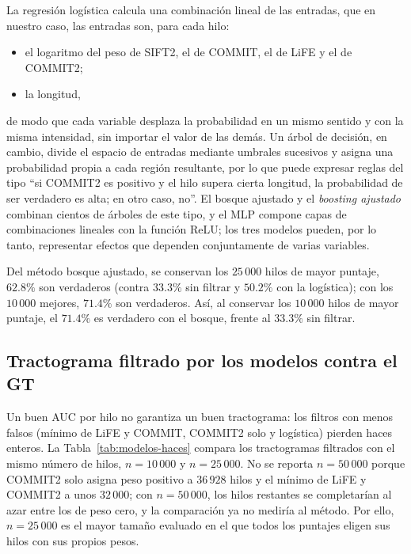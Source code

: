 \documentclass[11pt,a4paper]{article}
\begin{document}
La regresión logística calcula una combinación lineal de las entradas, que en nuestro caso, las entradas son, para cada hilo:
\begin{itemize}
    \item el logaritmo del peso de SIFT2, el de COMMIT, el de LiFE y el de COMMIT2;
    \item la longitud,
\end{itemize}
de modo que cada variable desplaza la probabilidad en un mismo sentido y con la misma intensidad, sin importar el valor de las demás. Un árbol de decisión, en cambio, divide el espacio de entradas mediante umbrales sucesivos y asigna una probabilidad propia a cada región resultante, por lo que puede expresar reglas del tipo ``si COMMIT2 es positivo y el hilo supera cierta longitud, la probabilidad de ser verdadero es alta; en otro caso, no''. El bosque ajustado y el \textit{boosting ajustado} combinan cientos de árboles de este tipo, y el MLP compone capas de combinaciones lineales con la función ReLU; los tres modelos pueden, por lo tanto, representar efectos que dependen conjuntamente de varias variables.

Del método bosque ajustado, se conservan los $25\,000$ hilos de mayor puntaje, $62.8\%$ son verdaderos (contra $33.3\%$ sin filtrar y $50.2\%$ con la logística); con los $10\,000$ mejores, $71.4\%$ son verdaderos. Así, al conservar los $10\,000$ hilos de mayor puntaje, el $71.4\%$ es verdadero con el bosque, frente al $33.3\%$ sin filtrar.

\subsection{Tractograma filtrado por los modelos contra el GT}
\label{sec:modelos-haces}

Un buen AUC por hilo no garantiza un buen tractograma: los filtros con menos falsos
(mínimo de LiFE y COMMIT, COMMIT2 solo y logística) pierden haces enteros. %
La Tabla~\ref{tab:modelos-haces} compara los tractogramas
filtrados con el mismo n\'umero de hilos, $n=10\,000$ y $n=25\,000$. No se reporta $n=50\,000$ porque COMMIT2 solo asigna peso positivo a $36\,928$ hilos y el mínimo de LiFE y COMMIT2 a unos $32\,000$; con $n=50\,000$, los hilos restantes se completarían al azar entre los de peso cero, y la comparación ya no mediría al método. Por ello, $n=25\,000$ es el mayor tamaño evaluado en el que todos los puntajes eligen sus hilos con sus propios pesos.
\end{document}
